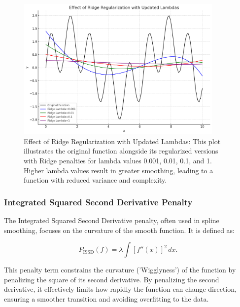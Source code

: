 \documentclass[12pt, twoside,hidelinks]{article}
\theoremstyle{definition}
\numberwithin{equation}{section}
\begin{document}
\begin{figure}[H]
\centering
\includegraphics[width=0.9\textwidth]{visuals/ridge_effect.png}
\caption{Effect of Ridge Regularization with Updated Lambdas: This plot illustrates the original function alongside its regularized versions with Ridge penalties for lambda values 0.001, 0.01, 0.1, and 1. Higher lambda values result in greater smoothing, leading to a function with reduced variance and complexity.}
\label{fig:ridge_effect}
\end{figure}

\subsubsection*{Integrated Squared Second Derivative Penalty}

The Integrated Squared Second Derivative penalty, often used in spline smoothing, focuses on the curvature of the smooth function. It is defined as:

\begin{equation}
    P_{\text{ISSD}}(f) = \lambda \int [f''(x)]^2 \, dx.
    \label{eq:ISSD_penalty}
\end{equation}

This penalty term constrains the curvature ('Wigglyness') of the function by penalizing the square of its second derivative. By penalizing the second derivative, it effectively limits how rapidly the function can change direction, ensuring a smoother transition and avoiding overfitting to the data.
\end{document}
